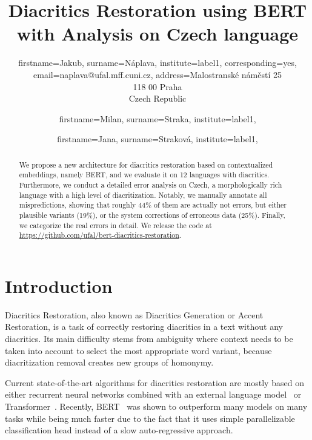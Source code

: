\documentclass{pbmlarxiv}
\begin{document}
\title{Diacritics Restoration using BERT with Analysis on Czech language}





\author{
  firstname=Jakub,
  surname=Náplava,
  institute=label1,
  corresponding=yes,
  email={naplava@ufal.mff.cuni.cz},
  address={Malostranské náměstí 25\\118 00 Praha\\Czech Republic}
}
\author{
  firstname=Milan,
  surname=Straka,
  institute=label1,
}

\author{
  firstname=Jana,
  surname=Straková,
  institute=label1,
}






\PBMLmaketitle





\begin{abstract}
    We propose a new architecture for diacritics restoration based on contextualized embeddings, namely BERT, and we evaluate it on 12 languages with diacritics. Furthermore, we conduct a detailed error analysis on Czech, a morphologically rich language with a high level of diacritization. Notably, we manually annotate all mispredictions, showing that roughly 44\% of them are actually not errors, but either plausible variants (19\%), or the system corrections of erroneous data (25\%). Finally, we categorize the real errors in detail. We release the code at \url{https://github.com/ufal/bert-diacritics-restoration}.
\end{abstract}

\section{Introduction}

Diacritics Restoration, also known as Diacritics Generation or Accent Restoration, is a task of correctly restoring diacritics in a text without any diacritics. Its main difficulty stems from ambiguity where context needs to be taken into account to select the most appropriate word variant, because diacritization removal creates new groups of homonymy. 

Current state-of-the-art algorithms for diacritics restoration are mostly based on either recurrent neural networks combined with an external language model~\cite{naplava2018diacritics, alkhamissi2020deep} or Transformer~\cite{mubarak2019highly}. Recently, BERT~\cite{devlin2018bert} was shown to outperform many models on many tasks while being much faster due to the fact that it uses simple parallelizable classification head instead of a slow auto-regressive approach.
\end{document}
